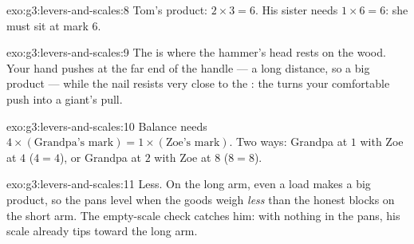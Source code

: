 \begin{solution}{exo:g3:levers-and-scales:8}
Tom's product: $2 \times 3 = 6$. His sister needs $1 \times 6 = 6$:
she must sit at mark $6$.
\end{solution}

\begin{solution}{exo:g3:levers-and-scales:9}
The  is where the hammer's head rests on the wood. Your hand
pushes at the far end of the handle --- a long distance, so a big
product --- while the nail resists very close to the : the
 turns your comfortable push into a giant's pull.
\end{solution}

\begin{solution}{exo:g3:levers-and-scales:10}
Balance needs $4 \times (\text{Grandpa's mark}) = 1 \times
(\text{Zoe's mark})$. Two ways: Grandpa at $1$ with Zoe at $4$
($4 = 4$), or Grandpa at $2$ with Zoe at $8$ ($8 = 8$).
\end{solution}

\begin{solution}{exo:g3:levers-and-scales:11}
Less. On the long arm, even a  load makes a big product, so the
pans level when the goods weigh \emph{less} than the honest blocks
on the short arm. The empty-scale check catches him: with nothing in
the pans, his scale already tips toward the long arm.
\end{solution}
